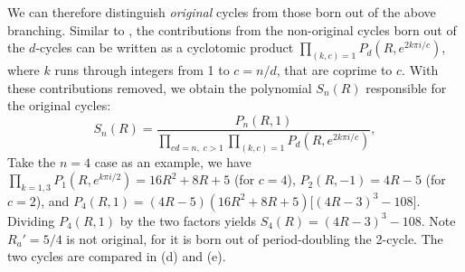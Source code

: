 \documentclass{ws-ijbc}
\begin{document}
We can therefore distinguish \emph{original} cycles
  from those born out of the above branching.
Similar to ,
  the contributions from the non-original cycles
  born out of the $d$-cycles
  can be written as a cyclotomic product
  $\prod_{(k, c) = 1}
      P_{d}
        \left(
          R, e^{2k\pi i/c}
        \right)$,
where $k$ runs through integers from 1 to $c=n/d$,
  that are coprime to $c$.
With these contributions removed,
  we obtain the polynomial $S_n(R)$ responsible for the original cycles:
  \begin{equation}
    S_n(R)
    = \frac
    {
      P_n(R, 1)
    }
    {
      \prod_{c d =  n, \; c > 1}
        \prod_{(k, c) = 1}
      P_{d}
        \left(
          R, e^{2k\pi i/c}
        \right)
    },
  \label{eq:origfac}
  \end{equation}
%
%
%
Take the $n = 4$ case as an example, we have
$\prod_{k=1,3} P_1(R, e^{k\pi i/2})
=16R^2+8R+5$
(for $c = 4$),
$P_2(R, -1) = 4R - 5$
(for $c = 2$),
and
$P_4(R, 1)
= (4R - 5) (16 R^2 + 8 R + 5)
  \bigl[
    (4R - 3)^3 - 108
  \bigr]$.
Dividing $P_4(R, 1)$ by the two factors yields
$S_4(R) = (4R-3)^3 - 108$.
Note $R_a' = 5/4$ is not original,
  for it is born out of period-doubling the 2-cycle.
The two cycles are compared in (d) and (e).
\end{document}
